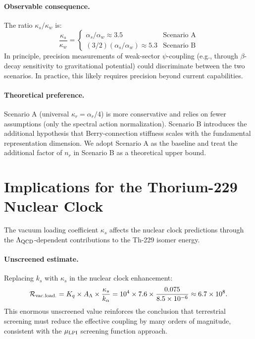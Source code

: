 \documentclass[11pt,letterpaper]{article}
\newcommand{\kalpha}{k_\alpha}
\theoremstyle{definition}
\begin{document}
\paragraph{Observable consequence.}
The ratio $\kappa_s/\kappa_w$ is:
\begin{equation}
\frac{\kappa_s}{\kappa_w} =
\begin{cases}
\alpha_s/\alpha_w \approx 3.5 & \text{Scenario A} \\
(3/2)(\alpha_s/\alpha_w) \approx 5.3 & \text{Scenario B}
\end{cases}
\end{equation}
In principle, precision measurements of weak-sector $\psi$-coupling
(e.g., through $\beta$-decay sensitivity to gravitational potential)
could discriminate between the two scenarios.  In practice, this
likely requires precision beyond current capabilities.

\paragraph{Theoretical preference.}
Scenario A (universal $\kappa_r = \alpha_r/4$) is more conservative
and relies on fewer assumptions (only the spectral action
normalization).  Scenario B introduces the additional hypothesis
that Berry-connection stiffness scales with the fundamental
representation dimension.  We adopt Scenario A as the baseline
and treat the additional factor of $n_r$ in Scenario B as a
theoretical upper bound.

\section{Implications for the Thorium-229 Nuclear Clock}
\label{sec:thorium}

The vacuum loading coefficient $\kappa_s$ affects the nuclear clock
predictions through the $\Lambda_{\rm QCD}$-dependent contributions
to the Th-229 isomer energy.

\paragraph{Unscreened estimate.}
Replacing $k_s$ with $\kappa_s$ in the nuclear clock enhancement:
\begin{equation}
\mathcal{R}_{\rm vac.load.}
= K_q \times A_\Lambda \times \frac{\kappa_s}{\kalpha}
= 10^4 \times 7.6 \times \frac{0.075}{8.5 \times 10^{-6}}
\approx 6.7 \times 10^8.
\end{equation}
This enormous unscreened value reinforces the conclusion that
terrestrial screening must reduce the effective coupling by many
orders of magnitude, consistent with the $\mu_{\rm LPI}$ screening
function approach.
\end{document}
